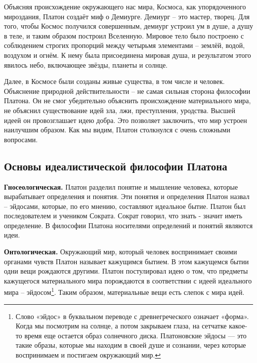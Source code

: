 \documentclass[
]{article}
\begin{document}
Объясняя происхождение окружающего нас мира, Космоса, как упорядоченного
мироздания, Платон создаёт миф о Демиурге. Демиург -- это мастер,
творец. Для того, чтобы Космос получился совершенным, демиург устроил ум
в душе, а душу в теле, и таким образом построил Вселенную. Мировое тело
было построено с соблюдением строгих пропорций между четырьмя элементами
-- землёй, водой, воздухом и огнём. К нему была присоединена мировая
душа, и результатом этого явилось небо, включающее звёзды, планеты и
солнце.

Далее, в Космосе были созданы живые существа, в том числе и человек.
Объяснение природной действительности -- не самая сильная сторона
философии Платона. Он не смог убедительно объяснить происхождение
материального мира, не объяснил существование идей зла, лжи,
преступления, уродства. Высшей идеей он провозглашает идею добра. Это
позволяет заключить, что мир устроен наилучшим образом. Как мы видим,
Платон столкнулся с очень сложными вопросами.

\hypertarget{ux43eux441ux43dux43eux432ux44b-ux438ux434ux435ux430ux43bux438ux441ux442ux438ux447ux435ux441ux43aux43eux439-ux444ux438ux43bux43eux441ux43eux444ux438ux438-ux43fux43bux430ux442ux43eux43dux430}{%
\subsection{Основы идеалистической философии
Платона}\label{ux43eux441ux43dux43eux432ux44b-ux438ux434ux435ux430ux43bux438ux441ux442ux438ux447ux435ux441ux43aux43eux439-ux444ux438ux43bux43eux441ux43eux444ux438ux438-ux43fux43bux430ux442ux43eux43dux430}}

\textbf{Гносеологическая.} Платон разделил понятие и мышление человека,
которые вырабатывает определения и понятия. Эти понятия и определения
Платон назвал -- эйдосами, которые, по его мнению, составляют идеальное
бытие. Платон был последователем и учеником Сократа. Сократ говорил, что
знать - значит иметь определение. В философии Платона носителями
определений и понятий являются идеи.

\textbf{Онтологическая.} Окружающий мир, который человек воспринимает
своими органами чувств Платон называет кажущимся бытием. В этом
кажущемся бытии одни вещи рождаются другими. Платон постулировал идею о
том, что предметы кажущегося материального мира порождаются в
соответствии с идеей идеального мира -- эйдосом\footnote{Слово «эйдос» в
  буквальном переводе с древнегреческого означает «форма». Когда мы
  посмотрим на солнце, а потом закрываем глаза, на сетчатке какое-то
  время еще остается образ солнечного диска. Платоновские эйдосы --- это
  такие образы, которые мы находим в своей душе и сознании, через
  которые воспринимаем и постигаем окружающий мир.}. Таким образом,
материальные вещи есть слепок с мира идей.
\end{document}
